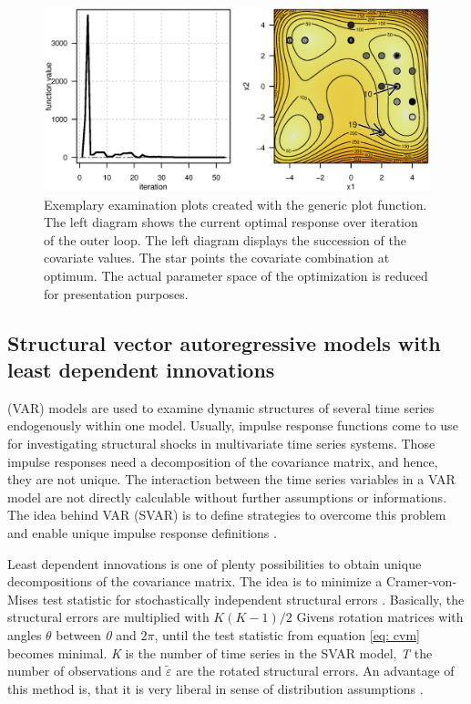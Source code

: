 \begin{figure}[htbp]
\centering
\includegraphics[width=1.025\textwidth]{Fig/fig2-ex2-plot.eps}
\caption{Exemplary examination plots created with the generic plot function. The left diagram shows the current optimal response over iteration of the outer loop. The left diagram displays the succession of the covariate values. The star points the covariate combination at optimum. The actual parameter space of the optimization is reduced for presentation purposes.}
\label{fig:fig2}
\end{figure}

\subsection{Structural vector autoregressive models with least dependent innovations}
 (VAR) models are used to examine dynamic structures of several time series endogenously within one model. Usually, impulse response functions come to use for investigating structural shocks in multivariate time series systems. Those impulse responses need a decomposition of the covariance matrix, and hence, they are not unique. The interaction between the time series variables in a VAR model are not directly calculable without further assumptions or informations. The idea behind  VAR (SVAR) is to define strategies to overcome this problem and enable unique impulse response definitions \citep{lutkepohl_2006}.

Least dependent innovations is one of plenty possibilities to obtain unique decompositions of the covariance matrix. The idea is to minimize a Cramer-von-Mises test statistic for stochastically independent structural errors \citep{genest_2007}. Basically, the structural errors are multiplied with $K(K-1)/2$ Givens rotation matrices with angles $\theta$ between \textit{0} and $2\pi$, until the test statistic from equation \ref{eq: cvm} becomes minimal. \textit{K} is the number of time series in the SVAR model, \textit{T} the number of observations and $\tilde{\varepsilon}$ are the rotated structural errors. An advantage of this method is, that it is very liberal in sense of distribution assumptions \citep{herwartz_2014}.

